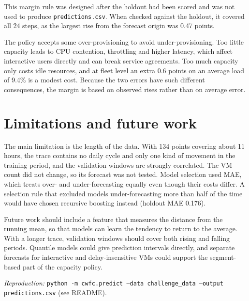 \documentclass[11pt,a4paper]{article}
\newcommand{\m}[1]{\texttt{#1}}
\begin{document}
This margin rule was designed after the holdout had been scored and was not used to produce \m{predictions.csv}. When checked against the holdout, it covered all 24 steps, as the largest rise from the forecast origin was 0.47 points.

The policy accepts some over-provisioning to avoid under-provisioning. Too little capacity leads to CPU contention, throttling and higher latency, which affect interactive users directly and can break service agreements. Too much capacity only costs idle resources, and at fleet level an extra 0.6 points on an average load of 9.4\% is a modest cost. Because the two errors have such different consequences, the margin is based on observed rises rather than on average error.

\section{Limitations and future work}

The main limitation is the length of the data. With 134 points covering about 11 hours, the trace contains no daily cycle and only one kind of movement in the training period, and the validation windows are strongly correlated. The VM count did not change, so its forecast was not tested. Model selection used MAE, which treats over- and under-forecasting equally even though their costs differ. A selection rule that excluded models under-forecasting more than half of the time would have chosen recursive boosting instead (holdout MAE 0.176).

Future work should include a feature that measures the distance from the running mean, so that models can learn the tendency to return to the average. With a longer trace, validation windows should cover both rising and falling periods. Quantile models could give prediction intervals directly, and separate forecasts for interactive and delay-insensitive VMs could support the segment-based part of the capacity policy.

\vspace{1em}
\textit{Reproduction:} \m{python -m cwfc.predict --data challenge\_data --output predictions.csv} (see README).
\end{document}
